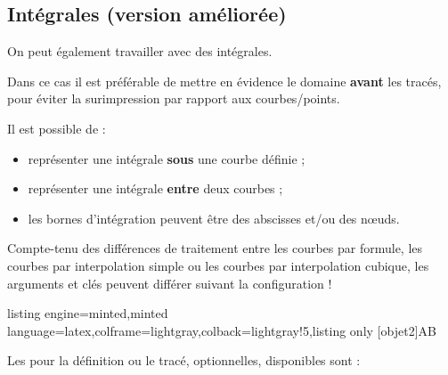 \documentclass[11pt,a4paper]{ltxdoc}
\begin{document}
\pagebreak

\subsection{Intégrales (version améliorée)}\label{integr}

On peut également travailler avec des intégrales.

Dans ce cas il est préférable de mettre en évidence le domaine \textbf{avant} les tracés, pour éviter la surimpression par rapport aux courbes/points.

\smallskip

Il est possible de :

\begin{itemize}
  \item représenter une intégrale \textbf{sous} une courbe définie ;
  \item représenter une intégrale \textbf{entre} deux courbes ;
  \item les bornes d'intégration peuvent être des abscisses et/ou des nœuds.
\end{itemize}

\smallskip

{\small\faBomb} Compte-tenu des différences de traitement entre les courbes par formule, les courbes par interpolation simple ou les courbes par interpolation cubique, les arguments et clés peuvent différer suivant la configuration !

\begin{tcblisting}{listing engine=minted,minted language=latex,colframe=lightgray,colback=lightgray!5,listing only}
[objet2]{A}{B}
\end{tcblisting}

Les \MontreCode{[clés]} pour la définition ou le tracé, optionnelles, disponibles sont :
\end{document}
